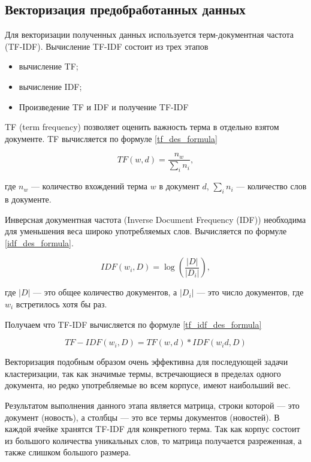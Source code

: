 \subsection{Векторизация предобработанных данных}

Для векторизации полученных данных используется терм-документная частота (TF-IDF). Вычисление TF-IDF состоит из трех этапов

\begin{itemize}
	\item вычисление TF;
	\item вычисление IDF;
	\item Произведение TF и IDF и получение TF-IDF
\end{itemize}

TF (term frequency) позволяет оценить важность терма в отдельно взятом документе. TF вычисляется по формуле \ref{tf_des_formula}

\begin{equation}
\label{tf_des_formula}
TF(w, d) = \frac{n_w}{\sum_{i}n_i},
\end{equation}

где $n_w$ --- количество вхождений терма $w$ в документ $d$, $\sum_{i}n_i$ --- количество слов в документе.

Инверсная документная частота (Inverse Document Frequency (IDF)) необходима для уменьшения веса широко употребляемых слов. Вычисляется по формуле \ref{idf_des_formula}.

\begin{equation}
\label{idf_des_formula}
IDF(w_i, D) = \log{(\frac{|D|}{|D_i|})},
\end{equation}

где $|D|$ --- это общее количество документов, а $|D_i|$ --- это число документов, где $w_i$ встретилось хотя бы раз.

Получаем что TF-IDF вычисляется по формуле \ref{tf_idf_des_formula}

\begin{equation}
\label{tf_idf_des_formula}
TF-IDF(w_i, D) = TF(w, d) * IDF(w_id, D)
\end{equation}

Векторизация подобным образом очень эффективна для последующей задачи кластеризации, так как значимые термы, встречающиеся в пределах одного документа, но редко употребляемые во всем корпусе, имеют наибольший вес.

Результатом выполнения данного этапа является матрица, строки которой --- это документ (новость), а столбцы --- это все термы документов (новостей). В каждой ячейке хранятся TF-IDF для конкретного терма. Так как корпус состоит из большого количества уникальных слов, то матрица получается разреженная, а также слишком большого размера.

